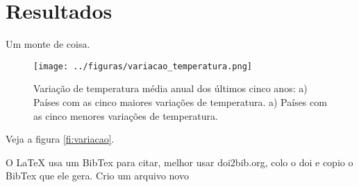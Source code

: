 \documentclass{article}
\begin{document}
\section{Resultados}

Um monte de coisa.

\begin{figure}[tb!] 
	\centering
	\texttt{[image: ../figuras/variacao\_temperatura.png]}
	\caption{
	Variação de temperatura média anual dos últimos cinco anos:
	a) Países com as cinco maiores variações de temperatura.
	a) Países com as cinco menores variações de temperatura.
	}
	\label{fig:variacao}
\end{figure}

Veja a figura \ref{fi:variacao}.


O LaTeX usa um BibTex para citar, melhor usar doi2bib.org, colo o doi e copio o 
BibTex que ele gera.
Crio um arquivo novo




\end{document}
